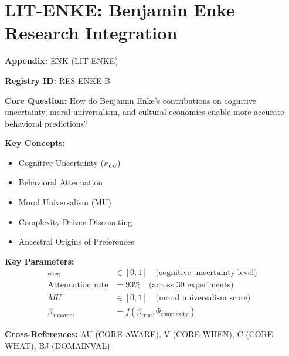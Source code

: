 \chapter{LIT-ENKE: Benjamin Enke Research Integration}
\label{app:enk}


\begin{tcolorbox}[colback=blue!5!white, colframe=blue!75!black,
    title=Quick Reference: Appendix ENK]

\textbf{Appendix:} ENK (LIT-ENKE)

\textbf{Registry ID:} RES-ENKE-B

\textbf{Core Question:} How do Benjamin Enke's contributions on cognitive uncertainty,
moral universalism, and cultural economics enable more accurate behavioral predictions?

\textbf{Key Concepts:}
\begin{itemize}[nosep]
\item Cognitive Uncertainty ($\kappa_{CU}$)
\item Behavioral Attenuation
\item Moral Universalism (MU)
\item Complexity-Driven Discounting
\item Ancestral Origins of Preferences
\end{itemize}

\textbf{Key Parameters:}
\begin{align}
\kappa_{CU} &\in [0, 1] \quad \text{(cognitive uncertainty level)} \\
\text{Attenuation rate} &= 93\% \quad \text{(across 30 experiments)} \\
MU &\in [0, 1] \quad \text{(moral universalism score)} \\
\beta_{\text{apparent}} &= f(\beta_{\text{true}}, \Psi_{\text{complexity}})
\end{align}

\textbf{Cross-References:} AU (CORE-AWARE), V (CORE-WHEN), C (CORE-WHAT), BJ (DOMAINVAL)
\end{tcolorbox}


\begin{abstract}
This appendix documents the research contributions of Benjamin Enke
(Harvard University, h-index: 28) to behavioral and cultural economics
and their integration into the Evidence-Based Framework (EBF). Enke's work
is CENTRAL to EBF because it provides: (1) a formal theory of cognitive
uncertainty that explains anomalies across domains, (2) evidence that
hyperbolic discounting is a complexity artifact rather than a true preference,
(3) a new utility dimension (moral universalism) that explains political
ideology, and (4) cultural origins of preference heterogeneity. His research
fundamentally shapes EBF's AWARE, WHEN, WHAT, and WHO dimensions.
\end{abstract}


